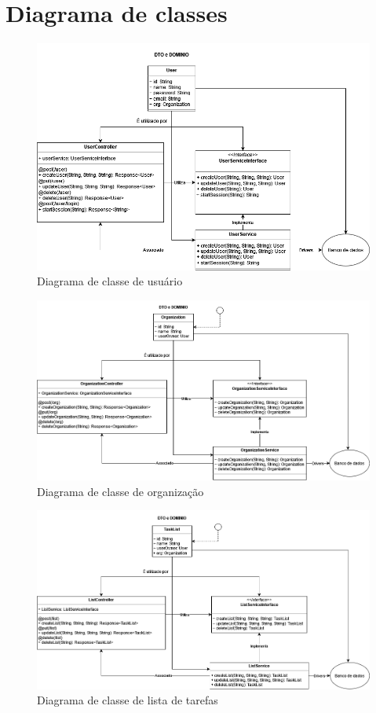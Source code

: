 \chapter{Diagrama de classes}

\begin{figure}[h]
    \centering
    \includegraphics[width=1\textwidth]{../figures/tarefa-User.png}
    \caption{Diagrama de classe de usuário}
    \label{fig:user}
\end{figure}

\begin{figure}[h]
    \centering
    \includegraphics[width=1\textwidth]{../figures/tarefa-Org.png}
    \caption{Diagrama de classe de organização}
    \label{fig:org}
\end{figure}

\begin{figure}[h]
    \centering
    \includegraphics[width=1\textwidth]{../figures/tarefa-TaskList.png}
    \caption{Diagrama de classe de lista de tarefas}
    \label{fig:task-list}
\end{figure}

